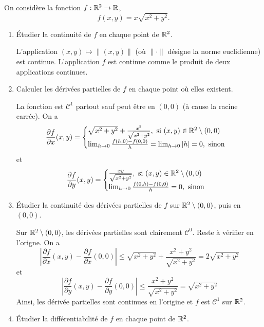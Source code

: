\documentclass{tp_um}
\begin{document}
\exo{}On consid\`ere la fonction $ f: \mathbb{R}^2 \to \mathbb{R}$, 
$$
f(x,y) = x \sqrt{ x^2 + y^2}.
$$
\begin{enumerate}
	\item \'Etudier la continuité de $f$ en chaque point de $ \mathbb{R}^2$. 

\bigskip
L'application $(x,y)\mapsto \|(x,y)\|$ (où $\| \cdot \|$ désigne la norme euclidienne) est continue. L'application $f$ est continue comme le produit de deux applications continues.
\bigskip

	\item Calculer les dérivées partielles de $f$ en chaque point o\`u elles existent. 

		\bigskip

La fonction est $\mathcal C^1$ partout sauf peut être en $(0,0)$ (à cause la racine carrée). On a 
\[\frac{\partial f}{\partial x} (x,y) =
\begin{cases}
	\sqrt{x^2+y^2} +\frac{x^2}{\sqrt{x^2+y^2}}, \text{ si $(x,y) \in \mathbb{R}^2 \setminus (0,0)$} \\
	\lim_{h\to 0} \frac{f(h,0) - f(0,0)}{h} = \lim_{h\to 0} |h| = 0 ,\text{ sinon}
	\end{cases} \]
et
\[\frac{\partial f}{\partial y} (x,y) =
\begin{cases}
	\frac{xy}{\sqrt{x^2+y^2}}, \text{ si $(x,y) \in \mathbb{R}^2 \setminus (0,0)$} \\
	\lim_{h\to 0} \frac{f(0,h) - f(0,0)}{h} = 0 ,\text{ sinon}
	\end{cases} \]

		\bigskip


	\item \'Etudier la continuit\'e des d\'eriv\'ees partielles de $f$ sur $ \mathbb{R} ^2 \setminus{(0,0)}$, puis en $(0,0)$.
		
		\bigskip
		
		Sur $ \mathbb{R} ^2 \setminus{(0,0)}$, les dérivées partielles sont clairement $\mathcal C^0$. Reste à vérifier en l'origne. On a 
		\[
			\left|\frac{\partial f}{\partial x} (x,y) - \frac{\partial f}{\partial x} (0,0) \right| \leq \sqrt{x^2 + y^2} +\frac{{x^2 + y^2} }{\sqrt{x^2 + y^2}} =2 \sqrt{x^2 + y^2}
	\]
	et
	\[
			\left|\frac{\partial f}{\partial y} (x,y)- \frac{\partial f}{\partial y} (0,0) \right| \leq\frac{{x^2 + y^2} }{\sqrt{x^2 + y^2}} =   \sqrt{x^2 + y^2}
	\]
	Ainsi, les dérivée partielles sont continues en l'origine et $f$ est $\mathcal C^1$ sur $\mathbb{R}^2$.
	\bigskip


	\item \'Etudier la  différentiabilité de $f$ en chaque point de $ \mathbb{R}^2$.


\end{enumerate}
\end{document}
